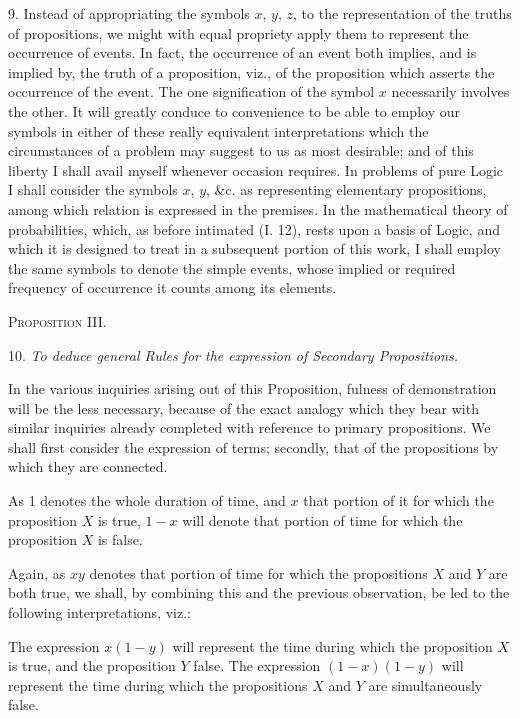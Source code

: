\documentclass[oneside]{book}
\begin{document}
9. Instead of appropriating the symbols $x$, $y$, $z$, to the
representation of the truths of propositions, we might with equal
propriety apply them to represent the occurrence of events. In fact,
the occurrence of an event both implies, and is implied by, the
truth of a proposition, viz., of the proposition which asserts the
occurrence of the event. The one signification of the symbol $x$
necessarily involves the other. It will greatly conduce to
convenience to be able to employ our symbols in either of these
really equivalent interpretations which the circumstances of a
problem may suggest to us as most desirable; and of this liberty
I shall avail myself whenever occasion requires. In problems of
pure Logic I shall consider the symbols $x$, $y$, \&c. as representing
elementary propositions, among which relation is expressed in
the premises. In the mathematical theory of probabilities, which,
as before intimated (I. 12), rests upon a basis of Logic, and
which it is designed to treat in a subsequent portion of this work,
I shall employ the same symbols to denote the simple events,
whose implied or required frequency of occurrence it counts
among its elements.

\begin{center}
\textsc{Proposition III.}
\end{center}

10. \textit{To deduce general Rules for the expression of Secondary
Propositions.}

In the various inquiries arising out of this Proposition, fulness
of demonstration will be the less necessary, because of the exact
analogy which they bear with similar inquiries already completed
with reference to primary propositions. We shall first consider
the expression of terms; secondly, that of the propositions by
which they are connected.


As 1 denotes the whole duration of time, and $x$ that portion
of it for which the proposition $X$ is true, $1 - x$ will denote that
portion of time for which the proposition $X$ is false.

Again, as $xy$ denotes that portion of time for which the
propositions $X$ and $Y$ are both true, we shall, by combining this and
the previous observation, be led to the following interpretations,
viz.:

The expression $x(1-y)$ will represent the time during which
the proposition $X$ is true, and the proposition $Y$ false. The
expression $(1-x)(1-y)$ will represent the time during which the
propositions $X$ and $Y$ are simultaneously false.
\end{document}
